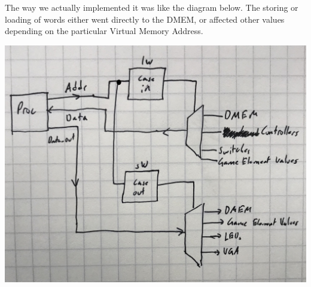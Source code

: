 \documentclass[letterpaper]{article} %
\begin{document}
	The way we actually implemented it was like the diagram below. The storing or loading of words either went directly to the DMEM, or affected other values depending on the particular Virtual Memory Address. \par
	\begin{center}
		\includegraphics[scale=.1]{VM_diagram}
	\end{center}\par
\end{document}
